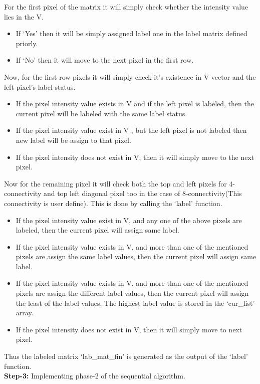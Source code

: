 \documentclass{report}
\begin{document}
\noindent For the first pixel of the matrix it will simply check whether the intensity value lies in the V.
\begin{itemize}
\item If  `Yes' then it will be simply assigned label one in the label matrix defined priorly.
\item If `No' then it will move to the next pixel in the first row.
\end{itemize}
Now, for the first row pixels it will simply check it's existence in V vector and the left pixel's label status.
\begin{itemize}
\item If the pixel intensity value exists in  V and if the left pixel is labeled, then the current pixel will be labeled with the same label status.
\item If the pixel intensity value exist in V , but the left pixel is not labeled then new label will be assign to that pixel.
\item If the pixel intensity does  not exist in V, then it will simply move to the next pixel.
\end{itemize}
Now for the remaining pixel it will  check both the top and left pixels for 4-connectivity and top  left diagonal pixel too  in the case of 8-connectivity(This connectivity is user define). This is done by calling the `label' function.
\begin{itemize}
\item  If the pixel intensity value exist in V, and any one of the above pixels are labeled, then the current pixel will assign same label.
\item If the pixel intensity value exists in V, and more than one of the mentioned pixels are assign the same label values, then the current pixel will assign same label.
\item If the pixel intensity value exists in V, and more than one of the mentioned pixels are assign the different label values, then the current pixel will assign the   least of the label values. The highest label value is stored in the `cur\_list'  array.
\item If the pixel intensity does not exist in V, then it will simply move to next pixel.
\end{itemize}
Thus the labeled matrix `lab\_mat\_fin' is generated as the output of the `label' function.\\

\noindent \textbf{Step-3:} Implementing phase-2 of the sequential algorithm.\\
\end{document}

